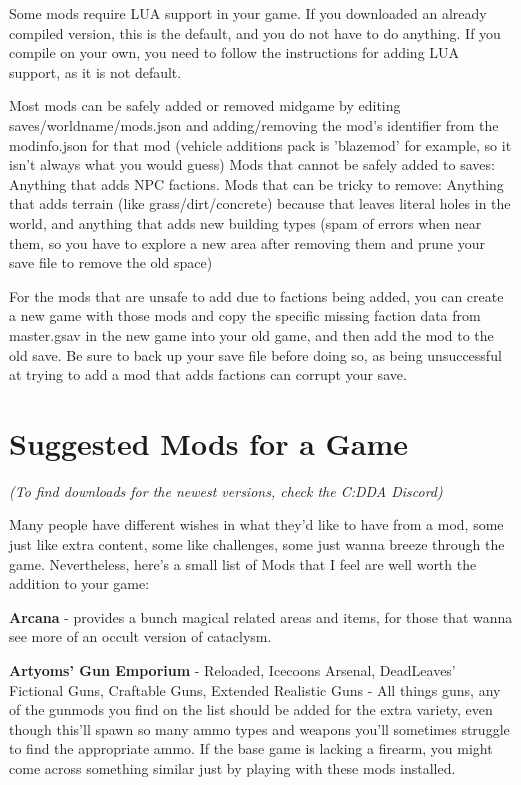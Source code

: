\documentclass[11pt]{report}
\begin{document}
Some mods require LUA support in your game.  If you downloaded an already compiled version, this is the default, and you do not have to do anything.  If you compile on your own, you need to follow the instructions for adding LUA support, as it is not default.

Most mods can be safely added or removed midgame by editing saves/worldname/mods.json and adding/removing the mod's identifier from the modinfo.json for that mod (vehicle additions pack is 'blazemod' for example, so it isn't always what you would guess)  Mods that cannot be safely added to saves: Anything that adds NPC factions.  Mods that can be tricky to remove: Anything that adds terrain (like grass/dirt/concrete) because that leaves literal holes in the world, and anything that adds new building types (spam of errors when near them, so you have to explore a new area after removing them and prune your save file to remove the old space)

For the mods that are unsafe to add due to factions being added, you can create a new game with those mods and copy the specific missing faction data from master.gsav in the new game into your old game, and then add the mod to the old save.  Be sure to back up your save file before doing so, as being unsuccessful at trying to add a mod that adds factions can corrupt your save.

\section{Suggested Mods for a Game}

\textit{(To find downloads for the newest versions, check the C:DDA Discord)}

Many people have different wishes in what they'd like to have from a mod, some just like extra content, some like challenges, some just wanna breeze through the game. Nevertheless, here's a small list of Mods that I feel are well worth the addition to your game:

\textbf{Arcana} - provides a bunch magical related areas and items, for those that wanna see more of an occult version of cataclysm.

\textbf{Artyoms' Gun Emporium} - Reloaded, Icecoons Arsenal, DeadLeaves' Fictional Guns, Craftable Guns, Extended Realistic Guns - All things guns, any of the gunmods you find on the list should be added for the extra variety, even though this'll spawn so many ammo types and weapons you'll sometimes struggle to find the appropriate ammo. If the base game is lacking a firearm, you might come across something similar just by playing with these mods installed.
\end{document}
